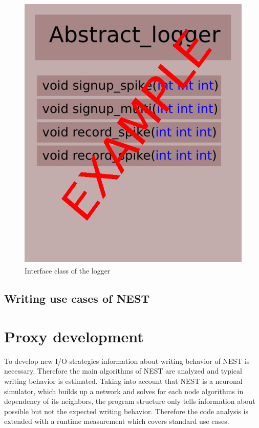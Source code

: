 \documentclass[]{YIC2015}
\begin{document}
\begin{figure}[htbp]
\centering %
\includegraphics[scale=0.5]{loggerinterface.eps}
\caption{Interface class of the logger}
\label{fig:loggerinterface}
\end{figure}


\subsection{Writing use cases of NEST}

\section{Proxy development}
To develop new I/O strategies information about writing behavior of NEST is necessary.
Therefore the main algorithms of NEST are analyzed and typical writing behavior is estimated.
Taking into account that NEST is a neuronal simulator,
which builds up a network and solves for each  node algorithms in dependency of its neighbors,
the program structure only tells information about possible but not the expected writing behavior.
Therefore the code analysis is extended with a runtime measurement which covers standard use cases.
\end{document}
